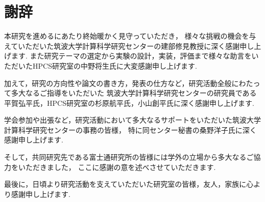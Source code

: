 \documentclass[a4paper,11pt,openany]{jreport}
\begin{document}
\chapter*{謝辞}
本研究を進めるにあたり終始暖かく見守っていただき，
様々な挑戦の機会を与えていただいた筑波大学計算科学研究センターの建部修見教授に深く感謝申し上げます.
また研究テーマの選定から実験の設計，実装，評価まで様々な助言をいただいたHPCS研究室の中野将生氏に大変感謝申し上げます.

加えて，研究の方向性や論文の書き方，発表の仕方など，研究活動全般にわたって多大なるご指導をいただいた
筑波大学計算科学研究センターの研究員である平賀弘平氏，HPCS研究室の杉原航平氏，小山創平氏に深く感謝申し上げます.

学会参加や出張など，研究活動において多大なるサポートをいただいた筑波大学計算科学研究センターの事務の皆様，
特に同センター秘書の桑野洋子氏に深く感謝申し上げます.

そして，共同研究先である富士通研究所の皆様には学外の立場から多大なるご協力をいただきました，
ここに感謝の意を述べさせていただきます.

最後に，日頃より研究活動を支えていただいた研究室の皆様，友人，家族に心より感謝申し上げます.


\newpage

\renewcommand{\bibname}{参考文献}

%
%





\nocite{*}


\end{document}
